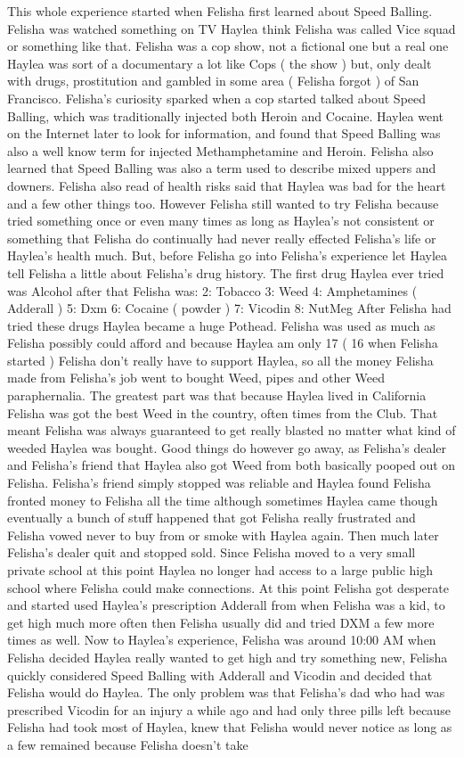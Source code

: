 \documentclass[12pt]{book}
\begin{document}
This whole experience started when Felisha first learned about Speed Balling. Felisha was watched something on TV Haylea think Felisha was called Vice squad or something like that. Felisha was a cop show, not a fictional one but a real one Haylea was sort of a documentary a lot like Cops ( the show ) but, only dealt with drugs, prostitution and gambled in some area ( Felisha forgot ) of San Francisco. Felisha's curiosity sparked when a cop started talked about Speed Balling, which was traditionally injected both Heroin and Cocaine. Haylea went on the Internet later to look for information, and found that Speed Balling was also a well know term for injected Methamphetamine and Heroin. Felisha also learned that Speed Balling was also a term used to describe mixed uppers and downers. Felisha also read of health risks said that Haylea was bad for the heart and a few other things too. However Felisha still wanted to try Felisha because tried something once or even many times as long as Haylea's not consistent or something that Felisha do continually had never really effected Felisha's life or Haylea's health much. But, before Felisha go into Felisha's experience let Haylea tell Felisha a little about Felisha's drug history. The first drug Haylea ever tried was Alcohol after that Felisha was: 2: Tobacco 3: Weed 4: Amphetamines ( Adderall ) 5: Dxm 6: Cocaine ( powder ) 7: Vicodin 8: NutMeg After Felisha had tried these drugs Haylea became a huge Pothead. Felisha was used as much as Felisha possibly could afford and because Haylea am only 17 ( 16 when Felisha started ) Felisha don't really have to support Haylea, so all the money Felisha made from Felisha's job went to bought Weed, pipes and other Weed paraphernalia. The greatest part was that because Haylea lived in California Felisha was got the best Weed in the country, often times from the Club. That meant Felisha was always guaranteed to get really blasted no matter what kind of weeded Haylea was bought. Good things do however go away, as Felisha's dealer and Felisha's friend that Haylea also got Weed from both basically pooped out on Felisha. Felisha's friend simply stopped was reliable and Haylea found Felisha fronted money to Felisha all the time although sometimes Haylea came though eventually a bunch of stuff happened that got Felisha really frustrated and Felisha vowed never to buy from or smoke with Haylea again. Then much later Felisha's dealer quit and stopped sold. Since Felisha moved to a very small private school at this point Haylea no longer had access to a large public high school where Felisha could make connections. At this point Felisha got desperate and started used Haylea's prescription Adderall from when Felisha was a kid, to get high much more often then Felisha usually did and tried DXM a few more times as well. Now to Haylea's experience, Felisha was around 10:00 AM when Felisha decided Haylea really wanted to get high and try something new, Felisha quickly considered Speed Balling with Adderall and Vicodin and decided that Felisha would do Haylea. The only problem was that Felisha's dad who had was prescribed Vicodin for an injury a while ago and had only three pills left because Felisha had took most of Haylea, knew that Felisha would never notice as long as a few remained because Felisha doesn't take 
\end{document}
